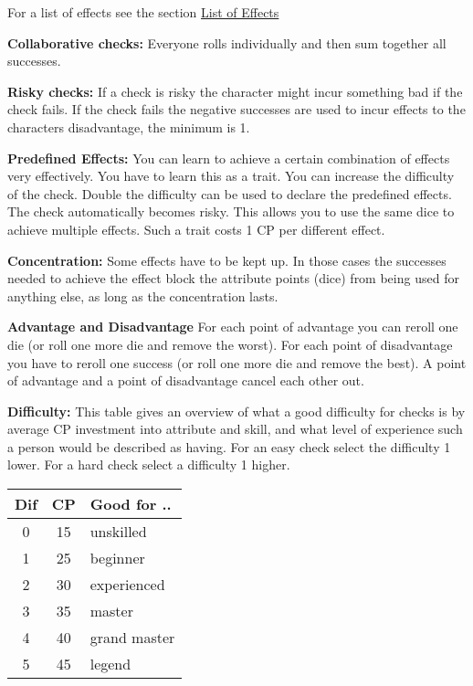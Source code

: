 \documentclass[11pt]{article}
\begin{document}
{\begin{multicols}{2}[]
For a list of effects see the section \hyperref[sec:org84288c7]{List of Effects}


\textbf{Collaborative checks:}
Everyone rolls individually and then sum together all successes.

\textbf{Risky checks:}
If a check is risky the character might incur something bad if the check fails. If the check fails the negative successes are used to incur effects to the characters disadvantage, the minimum is 1. 

\textbf{Predefined Effects:}
You can learn to achieve a certain combination of effects very effectively. You have to learn this as a trait. You can increase the difficulty of the check. Double the difficulty can be used to declare the predefined effects. The check automatically becomes risky. This allows you to use the same dice to achieve multiple effects. Such a trait costs 1 CP per different effect.

\textbf{Concentration:}
Some effects have to be kept up. In those cases the successes needed to achieve the effect block the attribute points (dice) from being used for anything else, as long as the concentration lasts. 

\textbf{Advantage and Disadvantage} 
For each point of advantage you can reroll one die (or roll one more die and remove the worst). For each point of disadvantage you have to reroll one success (or roll one more die and remove the best). A point of advantage and a point of disadvantage cancel each other out.

\textbf{Difficulty:}
This table gives an overview of what a good difficulty for checks is by average CP investment into attribute and skill, and what level of experience such a person would be described as having. For an easy check select the difficulty 1 lower. For a hard check select a difficulty 1 higher.

\begin{center}
\begin{tabular}{c|c|l}
\textbf{Dif} & \textbf{CP} & \textbf{Good for ..}\\
\hline
0 & 15 & unskilled\\
1 & 25 & beginner\\
2 & 30 & experienced\\
3 & 35 & master\\
4 & 40 & grand master\\
5 & 45 & legend\\
\end{tabular}
\end{center}



\end{multicols}}
\end{document}
